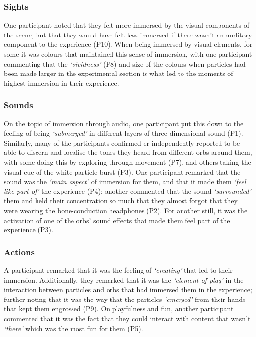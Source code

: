 \subsubsection{Sights}\label{sec: polaris-feedback-immersion-sights}
One participant noted that they felt more immersed by the visual components of the scene, but that they would have felt less immersed if there wasn't an auditory component to the experience (P10). When being immersed by visual elements, for some it was colours that maintained this sense of immersion, with one participant commenting that the \textit{`vividness'} (P8) and size of the colours when particles had been made larger in the experimental section is what led to the moments of highest immersion in their experience.

\subsubsection{Sounds}\label{sec: polaris-feedback-immersion-sounds}
On the topic of immersion through audio, one participant put this down to the feeling of being \textit{`submerged'} in different layers of three-dimensional sound (P1). Similarly, many of the participants confirmed or independently reported to be able to discern and localise the tones they heard from different orbs around them, with some doing this by exploring through movement (P7), and others taking the visual cue of the white particle burst (P3). One participant remarked that the sound was the \textit{`main aspect'} of immersion for them, and that it made them \textit{`feel like part of'} the experience (P4); another commented that the sound \textit{`surrounded'} them and held their concentration so much that they almost forgot that they were wearing the bone-conduction headphones (P2). For another still, it was the activation of one of the orbs' sound effects that made them feel part of the experience (P3).

\subsubsection{Actions}\label{sec: polaris-feedback-immersion-actions}
A participant remarked that it was the feeling of \textit{`creating'} that led to their immersion. Additionally, they remarked that it was the \textit{`element of play'} in the interaction between particles and orbs that had immersed them in the experience; further noting that it was the way that the particles \textit{`emerged'} from their hands that kept them engrossed (P9). On playfulness and fun, another participant commented that it was the fact that they could interact with content that wasn't \textit{`there'} which was the most fun for them (P5).

